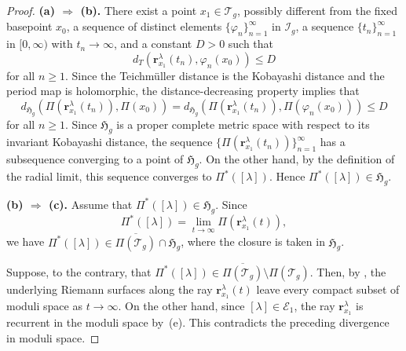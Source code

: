 \documentclass[dvipdfmx]{amsart}
\theoremstyle{remark}
\newcommand{\teich}{\mathcal{T}}
\newcommand{\torelliG}{\mathcal{I}}
\newcommand{\ray}{{\boldsymbol r}}
\newcommand{\syp}{\mathop{Sp}}
\begin{document}
\begin{proof}
{\bf (a) $\Rightarrow$ (b).}
There exist a point $x_1\in \teich_{g}$, possibly different from the fixed basepoint $x_0$, a sequence of distinct elements $\{\varphi_n\}_{n=1}^\infty$ in $\torelliG_{g}$, a sequence $\{t_n\}_{n=1}^\infty$ in $[0,\infty)$ with $t_n\to \infty$, and a constant $D>0$ such that
\[
d_T(\ray^{\lambda}_{x_1}(t_n),\varphi_n(x_0))\le D
\]
for all $n\ge 1$.
Since the Teichm\"uller distance is the Kobayashi distance and the period map is holomorphic, the distance-decreasing property implies that
\[
d_{\mathfrak{H}_g}(\Pi(\ray^{\lambda}_{x_1}(t_n)),\Pi(x_0))
=
d_{\mathfrak{H}_g}(\Pi(\ray^{\lambda}_{x_1}(t_n)),\Pi(\varphi_n(x_0)))
\le D
\]
for all $n\ge 1$.
Since $\mathfrak{H}_g$ is a proper complete metric space with respect to its invariant Kobayashi distance, the sequence
$\{\Pi(\ray^{\lambda}_{x_1}(t_n))\}_{n=1}^{\infty}$
has a subsequence converging to a point of $\mathfrak{H}_g$.
On the other hand, by the definition of the radial limit, this sequence converges to $\Pi^*([\lambda])$.
Hence $\Pi^*([\lambda])\in \mathfrak{H}_g$.

\medskip
\noindent
{\bf (b) $\Rightarrow$ (c).}
Assume that $\Pi^*([\lambda])\in \mathfrak{H}_g$.
Since
\[
\Pi^*([\lambda])=
\lim_{t\to \infty}\Pi(\ray^{\lambda}_{x_1}(t)),
\]
we have
$\Pi^*([\lambda])\in \overline{\Pi(\teich_g)}\cap \mathfrak{H}_g$,
where the closure is taken in $\mathfrak{H}_g$.

Suppose, to the contrary, that
$\Pi^*([\lambda])\in \overline{\Pi(\teich_g)}\setminus \Pi(\teich_g)$.
Then, 
by ,
the underlying Riemann surfaces along the ray
$\ray^{\lambda}_{x_1}(t)$ leave every compact subset of moduli space as $t\to \infty$.
On the other hand, since
$[\lambda]\in \mathcal{E}_1$, the ray $\ray^{\lambda}_{x_1}$ is recurrent in the moduli space by \,(e).
This contradicts the preceding divergence in moduli space.


\end{proof}
\end{document}
